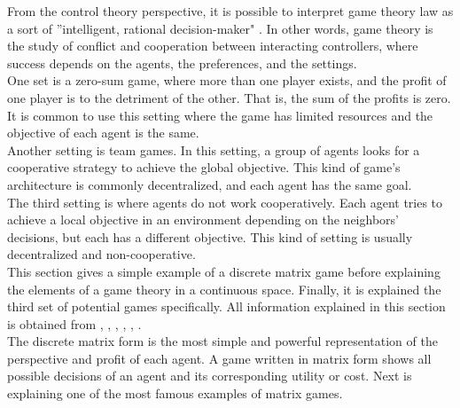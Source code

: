 From the control theory perspective, it is possible to interpret game theory law as a sort of ''intelligent, rational decision-maker" \cite{Marden2018}. In other words, game theory is the study of conflict and cooperation between interacting controllers, where success depends on the agents, the preferences, and the settings.
\\

One set is a zero-sum game, where more than one player exists, and the profit of one player is to the detriment of the other. That is, the sum of the profits is zero. It is common to use this setting where the game has limited resources and the objective of each agent is the same.
\\

Another setting is team games. In this setting, a group of agents looks for a cooperative strategy to achieve the global objective. This kind of game's architecture is commonly decentralized, and each agent has the same goal.
\\

The third setting is where agents do not work cooperatively. Each agent tries to achieve a local objective in an environment depending on the neighbors' decisions, but each has a different objective. This kind of setting is usually decentralized and non-cooperative.
\\

This section gives a simple example of a discrete matrix game before explaining the elements of a game theory in a continuous space. Finally, it is explained the third set of potential games specifically. All information explained in this section is obtained from \cite{18t_article}, \cite{19t_article}, \cite{20t_article}, \cite{29t_book}, \cite{30t_phdthesis}, \cite{46t_inproceedings}.
\\

The discrete matrix form is the most simple and powerful representation of the perspective and profit of each agent. A game written in matrix form shows all possible decisions of an agent and its corresponding utility or cost. Next is explaining one of the most famous examples of matrix games.
\\

